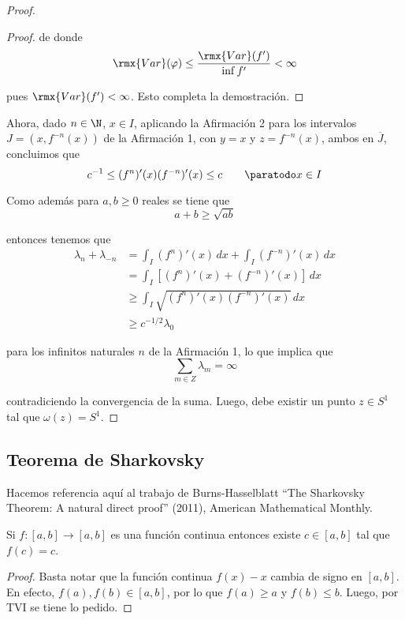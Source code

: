 \documentclass[	docname= Sistemas\ Din\'amicos,
				finished=1,
				semester=1,
				year=2017,
				professor=Godofredo\ Iommi,
				sigla=MAT2565]{apunte}
\begin{document}
\begin{proof}
\begin{afirmacion}
\begin{proof}
		de donde
			$$\rmx{Var}(\varphi) \leq \frac{\rmx{Var}(f')}{\inf f'} < \infty$$
		
		pues $\rmx{Var}(f') < \infty$. Esto completa la demostración.
		\end{proof}
	\end{afirmacion}

	Ahora, dado $n \in \N$, $x \in I$, aplicando la Afirmación 2 para los intervalos $J = (x, f^{-n}(x))$ de la Afirmación 1, con $y = x$ y $z = f^{-n}(x)$, ambos en $\overline{J}$, concluimos que
		$$c^{-1} \leq (f^{n})'(x)(f^{-n})'(x) \leq c \qquad \paratodo x \in I$$
	
	Como además para $a,b \geq 0$ reales se tiene que
		$$a + b \geq \sqrt{ab}$$
	
	entonces tenemos que
		\begin{align*}
			\lambda_{n} + \lambda_{-n}
				&=		\int_{I} (f^{n})'(x) \, dx + \int_{I} (f^{-n})'(x) \, dx	\\
				&=		\int_{I} [(f^{n})'(x) + (f^{-n})'(x)] \, dx	\\
				&\geq	\int_{I} \sqrt{(f^{n})'(x)(f^{-n})'(x)} \, dx	\\
				&\geq	c^{-1/2}\lambda_{0}
		\end{align*}
	
	para los infinitos naturales $n$ de la Afirmación 1, lo que implica que
		$$\sum_{m \in Z} \lambda_{m} = \infty$$
	
	contradiciendo la convergencia de la suma. Luego, debe existir un punto $z \in S^{1}$ tal que $\omega(z) = S^{1}$.
\end{proof}

\subsection{Teorema de Sharkovsky}
Hacemos referencia aquí al trabajo de Burns-Hasselblatt ``The Sharkovsky Theorem: A natural direct proof'' (2011), American Mathematical Monthly.

\begin{lem}  Si $f: [a,b] \to [a,b]$ es una función continua entonces existe $c \in [a,b]$ tal que $f(c) = c$. 
\end{lem}

\begin{proof} Basta notar que la función continua $f(x) - x$ cambia de signo en $[a,b]$. En efecto, $f(a), f(b) \in [a,b]$, por lo que $f(a) \geq a$ y $f(b) \leq b$. Luego, por TVI se tiene lo pedido.
\end{proof}
\end{document}
